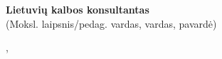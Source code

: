 \begin{titlepage}
\begin{flushleft}
        {\hspace*{1,27cm} \bf Lietuvių kalbos konsultantas \hspace{1em} \thesisLTconsultant \hfil} \\
        {\hspace*{7cm}  (Moksl. laipsnis/pedag. vardas, vardas, pavardė)}

    \end{flushleft}


    \begin{center}
        \vspace{10pt}
        \city, \ \the\year{}
    \end{center}

\end{titlepage}
